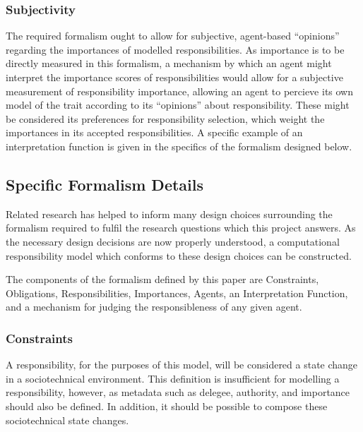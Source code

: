 \subsubsection{Subjectivity}
The required formalism ought to allow for subjective, agent-based ``opinions'' regarding the importances of modelled responsibilities. As importance is to be directly measured in this formalism, a mechanism by which an agent might interpret the importance scores of responsibilities would allow for a subjective measurement of responsibility importance, allowing an agent to percieve its own model of the trait according to its ``opinions'' about responsibility. These might be considered its preferences for responsibility selection, which weight the importances in its accepted responsibilities. A specific example of an interpretation function is given in the specifics of the formalism designed below.

\subsection{Specific Formalism Details}

Related research has helped to inform many design choices surrounding the formalism required to fulfil the research questions which this project answers. As the necessary design decisions are now properly understood, a computational responsibility model which conforms to these design choices can be constructed.\par

The components of the formalism defined by this paper are Constraints, Obligations, Responsibilities, Importances, Agents, an Interpretation Function, and a mechanism for judging the responsibleness of any given agent.\par

\subsubsection{Constraints}  %
A responsibility, for the purposes of this model, will be considered a state change in a sociotechnical environment. This definition is insufficient for modelling a responsibility, however, as metadata such as delegee, authority, and importance should also be defined. In addition, it should be possible to compose these sociotechnical state changes.\par

